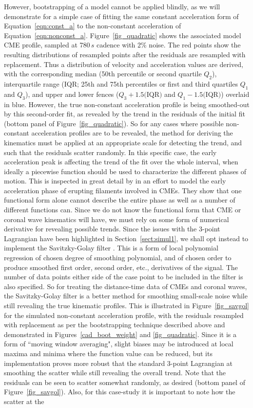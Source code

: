 \documentclass[structabstract]{aa}
\begin{document}
However, bootstrapping of a model cannot be applied blindly, as we will demonstrate for a simple case of fitting the same constant acceleration form of Equation~\ref{eqn:const_a} to the non-constant acceleration of Equation~\ref{eqn:nonconst_a}. Figure~\ref{fig_quadratic} shows the associated model CME profile, sampled at 780$\,s$ cadence with 2\% noise. The red points show the resulting distributions of resampled points after the residuals are resampled with replacement. Thus a distribution of velocity and acceleration values are derived, with the corresponding median (50th percentile or second quartile $Q_2$), interquartile range (IQR; 25th and 75th percentiles or first and third quartiles $Q_1$ and $Q_3$), and upper and lower fences ($Q_3+1.5($IQR$)$ and $Q_1-1.5($IQR$)$) overlaid in blue. However, the true non-constant acceleration profile is being smoothed-out by this second-order fit, as revealed by the trend in the residuals of the initial fit (bottom panel of Figure~\ref{fig_quadratic}). So for any cases where possible non-constant acceleration profiles are to be revealed, the method for deriving the kinematics must be applied at an appropriate scale for detecting the trend, and such that the residuals scatter randomly. In this specific case, the early acceleration peak is affecting the trend of the fit over the whole interval, when ideally a piecewise function should be used to characterize the different phases of motion. This is inspected in great detail by \citet{2008ApJ...674..586S} in an effort to model the early acceleration phase of erupting filaments involved in CMEs. They show that one functional form alone cannot describe the entire phase as well as a number of different functions can. Since we do not know the functional form that CME or coronal wave kinematics will have, we must rely on some form of numerical derivative for revealing possible trends. Since the issues with the 3-point Lagrangian have been highlighted in Section~\ref{sect:simul1}, we shall opt instead to implement the Savitzky-Golay filter \citep{Savitzky-Golay1964}. This is a form of local polynomial regression of chosen degree of smoothing polynomial, and of chosen order to produce smoothed first order, second order, etc., derivatives of the signal. The number of data points either side of the case point to be included in the filter is also specified. So for treating the distance-time data of CMEs and coronal waves, the Savitzky-Golay filter is a better method for smoothing small-scale noise while still revealing the true kinematic profiles. This is illustrated in Figure~\ref{fig_savgol} for the simulated non-constant acceleration profile, with the residuals resampled with replacement as per the bootstrapping technique described above and demonstrated in Figures~\ref{cad_boot_weight} and \ref{fig_quadratic}. Since it is a form of ``moving window averaging", slight biases may be introduced at local maxima and minima where the function value can be reduced, but its implementation proves more robust that the standard 3-point Lagrangian at smoothing the scatter while still revealing the overall trend. Note that the residuals can be seen to scatter somewhat randomly, as desired (bottom panel of Figure~\ref{fig_savgol}). Also, for this case-study it is important to note how the scatter at the 
\end{document}
